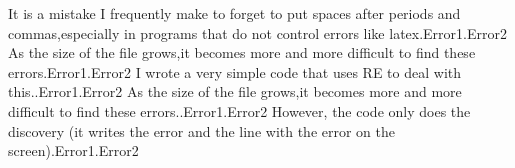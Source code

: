 It is a mistake I frequently make to forget to put spaces after periods and commas,especially in programs that do not control errors like latex.Error1.Error2
As the size of the file grows,it becomes more and more difficult to find these errors.Error1.Error2
I wrote a very simple code that uses RE to deal with this..Error1.Error2
As the size of the file grows,it becomes more and more difficult to find these errors..Error1.Error2
However, the code only does the discovery (it writes the error and the line with the error on the screen).Error1.Error2
